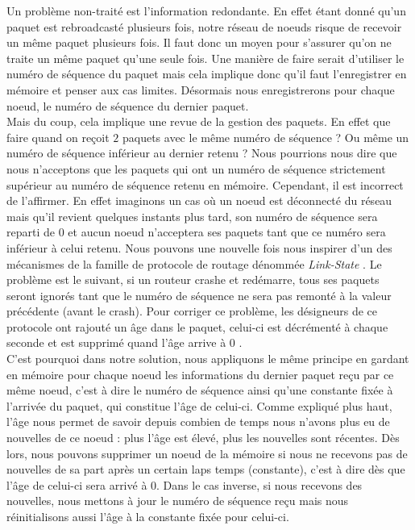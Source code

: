 \documentclass[journal, a4paper]{IEEEtran}
\begin{document}
        Un problème non-traité est l'information redondante. En effet étant donné qu'un paquet est rebroadcasté plusieurs fois, notre réseau de noeuds risque de recevoir un même paquet plusieurs 
        fois. Il faut donc un moyen pour s'assurer qu'on ne traite un même paquet qu'une seule fois. Une manière de faire serait d'utiliser le numéro de séquence du paquet mais cela implique donc 
        qu'il faut l'enregistrer en mémoire et penser aux cas limites. Désormais nous enregistrerons pour chaque noeud, le numéro de séquence du dernier paquet. \\

        Mais du coup, cela implique une revue de la gestion des paquets. En effet que faire quand on reçoit $2$ paquets avec le même numéro de séquence ? Ou même un numéro de séquence inférieur 
        au dernier retenu ? Nous pourrions nous dire que nous n'acceptons que les paquets qui ont un numéro de séquence strictement supérieur au numéro de séquence retenu en mémoire. Cependant, il 
        est incorrect de l'affirmer. En effet imaginons un cas où un noeud est déconnecté du réseau mais qu'il revient quelques instants plus tard, son numéro de séquence sera reparti de $0$ et 
        aucun noeud n'acceptera ses paquets tant que ce numéro sera inférieur à celui retenu. Nous pouvons une nouvelle fois nous inspirer d'un des mécanismes de la famille de protocole de routage dénommée \textit{Link-State} \cite{kurose2017computer}. 
        Le problème est le suivant, si un routeur crashe et redémarre, tous ses paquets 
        seront ignorés tant que le numéro de séquence ne sera pas remonté à la valeur précédente (avant le crash). Pour corriger ce problème, les désigneurs de ce protocole ont rajouté un âge 
        dans le paquet, celui-ci est décrémenté à chaque seconde et est supprimé quand l'âge arrive à $0$ \cite{perlman1983fault}. \\

        C'est pourquoi dans notre solution, nous appliquons le même principe en gardant en mémoire pour chaque noeud les informations du dernier paquet reçu par ce même noeud, c'est à dire le 
        numéro de séquence ainsi qu'une constante fixée à l'arrivée du paquet, qui constitue l'âge de celui-ci. Comme expliqué plus haut, l'âge nous permet de savoir depuis combien de temps nous 
        n'avons plus eu de nouvelles de ce noeud : plus l'âge est élevé, plus les nouvelles sont récentes. 
        Dès lors, nous pouvons supprimer un noeud de la mémoire si nous ne recevons pas de nouvelles de sa part après un certain laps temps (constante), c'est à dire dès que l'âge de celui-ci 
        sera arrivé à $0$. Dans le cas inverse, si nous recevons des nouvelles, nous mettons à jour le numéro de séquence reçu mais nous réinitialisons aussi l'âge à la constante fixée pour celui-ci. \\        
        
\end{document}
